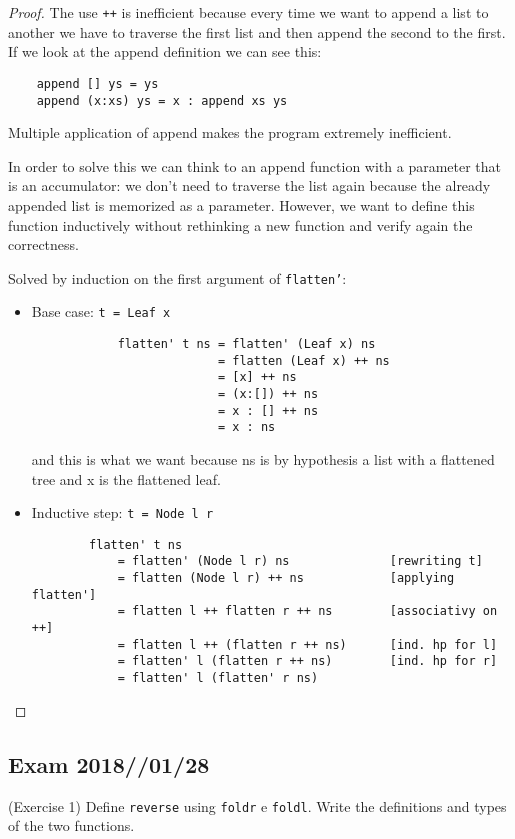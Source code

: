 \documentclass[12pt,a4paper,oneside]{book}
\begin{document}
\begin{proof}
	The use \texttt{++} is inefficient because every time we want to append a list to another we have to traverse the first list and then append the second to the first. If we look at the append definition we can see this:
	\begin{verbatim}
	append [] ys = ys
	append (x:xs) ys = x : append xs ys
	\end{verbatim}
	Multiple application of append makes the program extremely inefficient.
	
	In order to solve this we can think to an append function with a parameter that is an accumulator: we don't need to traverse the list again because the already appended list is memorized as a parameter.
	However, we want to define this function inductively without rethinking a new function and verify again the correctness.
	
	Solved by induction on the first argument of \texttt{flatten'}:
	\begin{itemize}
		\item Base case: \texttt{t = Leaf x}
		\begin{verbatim}
			flatten' t ns = flatten' (Leaf x) ns
			              = flatten (Leaf x) ++ ns
			              = [x] ++ ns
			              = (x:[]) ++ ns
			              = x : [] ++ ns
			              = x : ns
		\end{verbatim}
		and this is what we want because ns is by hypothesis a list
		with a flattened tree and x is the flattened leaf.
		
		\item Inductive step: \texttt{t = Node l r}
		\begin{verbatim}
		flatten' t ns 
		    = flatten' (Node l r) ns              [rewriting t]
		    = flatten (Node l r) ++ ns            [applying flatten']
		    = flatten l ++ flatten r ++ ns        [associativy on ++]
		    = flatten l ++ (flatten r ++ ns)      [ind. hp for l]
		    = flatten' l (flatten r ++ ns)        [ind. hp for r]
		    = flatten' l (flatten' r ns)
		\end{verbatim}
	\end{itemize}
\end{proof}

\subsection{Exam 2018//01/28}

\begin{exercise}{(Exercise 1)}
	Define \texttt{reverse} using \texttt{foldr} e \texttt{foldl}. Write the definitions and types of the two functions.
\end{exercise}
\end{document}
